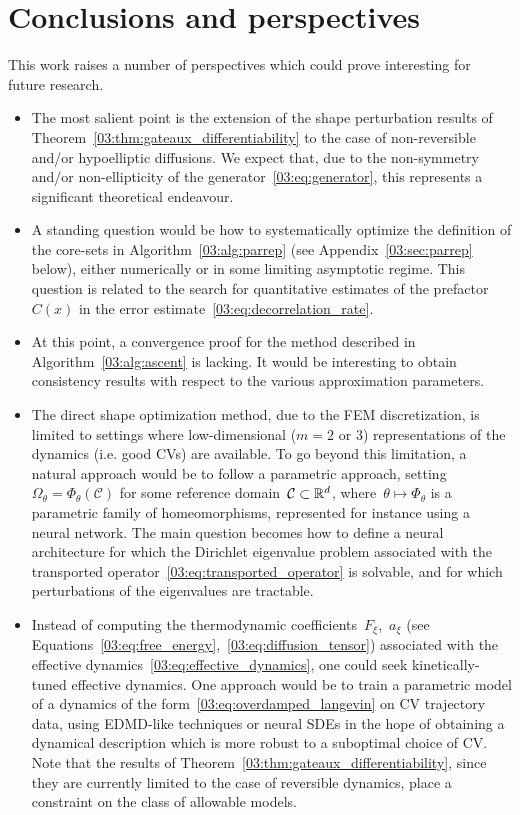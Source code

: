 \section{Conclusions and perspectives}
\label{03:sec:ccl}
This work raises a number of perspectives which could prove interesting for future research.
\begin{itemize}
    \item{The most salient point is the extension of the shape perturbation results of Theorem~\ref{03:thm:gateaux_differentiability} to the case of non-reversible and/or hypoelliptic diffusions. We expect that, due to the non-symmetry and/or non-ellipticity of the generator~\eqref{03:eq:generator}, this represents a significant theoretical endeavour.}
    \item{A standing question would be how to systematically optimize the definition of the core-sets in Algorithm~\ref{03:alg:parrep} (see Appendix~\ref{03:sec:parrep} below), either numerically or in some limiting asymptotic regime. This question is related to the search for quantitative estimates of the prefactor~$C(x)$ in the error estimate~\eqref{03:eq:decorrelation_rate}.}
    \item{At this point, a convergence proof for the method described in Algorithm~\ref{03:alg:ascent} is lacking. It would be interesting to obtain consistency results with respect to the various approximation parameters.}
    \item{The direct shape optimization method, due to the FEM discretization, is limited to settings where low-dimensional ($m=2$ or $3$) representations of the dynamics (i.e. good CVs) are available. To go beyond this limitation, a natural approach would be to follow a parametric approach, setting~$\Omega_\theta=\Phi_\theta(\mathcal C)$ for some reference domain~$\mathcal C\subset \mathbb{R}^d$, where~$\theta\mapsto \Phi_\theta$ is a parametric family of homeomorphisms, represented for instance using a neural network. The main question becomes how to define a neural architecture for which the Dirichlet eigenvalue problem associated with the transported operator~\eqref{03:eq:transported_operator} is solvable, and for which perturbations of the eigenvalues are tractable.}
    \item{Instead of computing the thermodynamic coefficients~$F_\xi$,~$a_\xi$ (see Equations~\eqref{03:eq:free_energy},~\eqref{03:eq:diffusion_tensor}) associated with the effective dynamics~\eqref{03:eq:effective_dynamics}, one could seek kinetically-tuned effective dynamics. One approach would be to train a parametric model of a dynamics of the form~\eqref{03:eq:overdamped_langevin} on CV trajectory data, using EDMD-like techniques or neural SDEs in the hope of obtaining a dynamical description which is more robust to a suboptimal choice of CV. Note that the results of Theorem~\ref{03:thm:gateaux_differentiability}, since they are currently limited to the case of reversible dynamics, place a constraint on the class of allowable models.}
\end{itemize}

